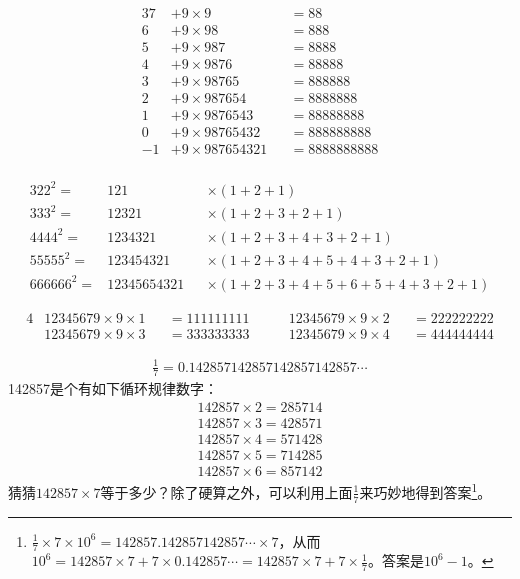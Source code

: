 \begin{example}
  \begin{alignat*}{3}
    7 &+ 9\times 9 &&{}= 88\\
    6 &+ 9\times 98 &&{}= 888\\
    5 &+ 9\times 987 &&{}= 8888\\
    4 &+ 9\times 9876 &&{}= 88888\\
    3 &+ 9\times 98765 &&{}= 888888\\
    2 &+ 9\times 987654 &&{}= 8888888\\
    1 &+ 9\times 9876543 &&{}= 88888888\\
    0 &+ 9\times 98765432 &&{}= 888888888\\
    -1& + 9\times 987654321 &&{}= 8888888888\\
  \end{alignat*}
\end{example}

\begin{example}
  \begin{alignat*}{3}
    22^2={}&121&&\times(1+2+1)\\
    333^2={}&12321&&\times(1+2+3+2+1)\\
    4444^2={}&1234321&&\times(1+2+3+4+3+2+1)\\
    55555^2={}&123454321&&\times(1+2+3+4+5+4+3+2+1)\\
    666666^2={}&12345654321&&\times(1+2+3+4+5+6+5+4+3+2+1)
  \end{alignat*}
\end{example}

\begin{example}[缺8数]
  \begin{alignat*}{4}
    &12345679\times9\times1 &&{}=111111111 &\quad\quad 12345679\times9\times2 &&{}=222222222\\
    &12345679\times9\times3 &&{}=333333333 &\quad\quad 12345679\times9\times4 &&{}=444444444
  \end{alignat*}
\end{example}

\begin{example}[$\frac17$，142857]
  \begin{align*}
    \frac17 = 0.142857142857142857142857\cdots
  \end{align*}
  142857是个有如下循环规律数字：
  \begin{align*}
    142857\times 2 = 285714\\
    142857\times 3 = 428571\\
    142857\times 4 = 571428\\
    142857\times 5 = 714285\\
    142857\times 6 = 857142
  \end{align*}
  猜猜$142857\times 7$等于多少？除了硬算之外，可以利用上面$\frac17$来巧妙地得到答案\footnote{$\frac17\times7\times10^6=142857.142857142857\cdots\times7$，从而$10^6=142857\times7 + 7\times0.142857\cdots=142857\times7+7\times\frac17$。答案是$10^6-1$。}。
\end{example}

